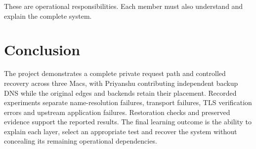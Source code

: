 \documentclass[12pt,a4paper]{article}
\begin{document}
These are operational responsibilities. Each member must also understand and
explain the complete system.

\section{Conclusion}


The project demonstrates a complete private request path and controlled recovery across three Macs, with Priyanshu contributing independent backup DNS while the original edges and backends retain their placement. Recorded experiments separate name-resolution failures, transport failures, TLS verification errors and upstream application failures. Restoration checks and preserved evidence support the reported results. The final learning outcome is the ability to explain each layer, select an appropriate test and recover the system without concealing its remaining operational dependencies.
\end{document}
